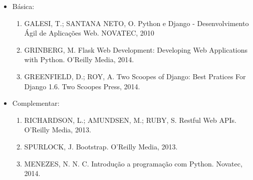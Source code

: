 \begin{itemize} 

\item Básica:
    \begin{enumerate}

    \item GALESI, T.; SANTANA NETO, O.
          Python e Django - Desenvolvimento Ágil de Aplicações Web.
          NOVATEC, 2010

    \item GRINBERG, M.
          Flask Web Development: Developing Web Applications with Python.
          O'Reilly Media, 2014.

    \item GREENFIELD, D.; ROY, A.
          Two Scoopes of Django: Best Pratices For Django 1.6.
          Two Scoopes Press, 2014.
    

	
    \end{enumerate}

\item Complementar:
	\begin{enumerate} 

    \item RICHARDSON, L.; AMUNDSEN, M.; RUBY, S.
          Restful Web APIs.
          O'Reilly Media, 2013.

    \item SPURLOCK, J.
          Bootstrap.
          O'Reilly Media, 2013.

    \item MENEZES, N. N. C.
          Introdução a programação com Python.
          Novatec, 2014.

	\end{enumerate}

\end{itemize}




